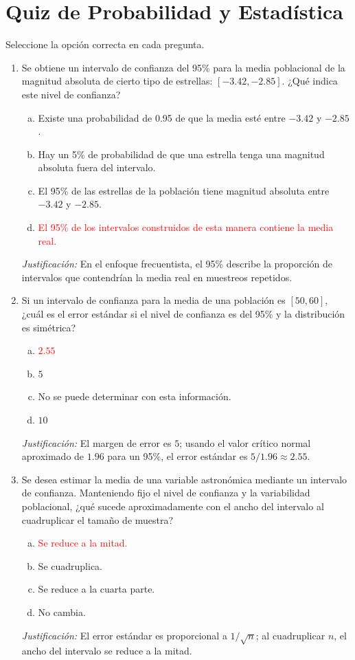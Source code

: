 \documentclass[a4paper]{article}
\begin{document}
\section{Quiz de Probabilidad y Estadística}

Seleccione la opción correcta en cada pregunta.

\begin{enumerate}

\item Se obtiene un intervalo de confianza del 95\% para la media poblacional de la magnitud absoluta de cierto tipo de estrellas: $[-3.42,-2.85]$. ¿Qué indica este nivel de confianza?
\begin{enumerate}[a)]
    \item Existe una probabilidad de 0.95 de que la media esté entre $-3.42$ y $-2.85$.
    \item Hay un 5\% de probabilidad de que una estrella tenga una magnitud absoluta fuera del intervalo.
    \item El 95\% de las estrellas de la población tiene magnitud absoluta entre $-3.42$ y $-2.85$.
    \item \textcolor{red}{El 95\% de los intervalos construidos de esta manera contiene la media real.}
\end{enumerate}
\smallskip
\textit{Justificación:} En el enfoque frecuentista, el 95\% describe la proporción de intervalos que contendrían la media real en muestreos repetidos.

\item Si un intervalo de confianza para la media de una población es $[50,60]$, ¿cuál es el error estándar si el nivel de confianza es del 95\% y la distribución es simétrica?
\begin{enumerate}[a)]
    \item \textcolor{red}{$2.55$}
    \item $5$
    \item No se puede determinar con esta información.
    \item $10$
\end{enumerate}
\smallskip
\textit{Justificación:} El margen de error es $5$; usando el valor crítico normal aproximado de $1.96$ para un 95\%, el error estándar es $5/1.96 \approx 2.55$.

\item Se desea estimar la media de una variable astronómica mediante un intervalo de confianza. Manteniendo fijo el nivel de confianza y la variabilidad poblacional, ¿qué sucede aproximadamente con el ancho del intervalo al cuadruplicar el tamaño de muestra?
\begin{enumerate}[a)]
    \item \textcolor{red}{Se reduce a la mitad.}
    \item Se cuadruplica.
    \item Se reduce a la cuarta parte.
    \item No cambia.
\end{enumerate}
\smallskip
\textit{Justificación:} El error estándar es proporcional a $1/\sqrt{n}$; al cuadruplicar $n$, el ancho del intervalo se reduce a la mitad.


\end{enumerate}
\end{document}
